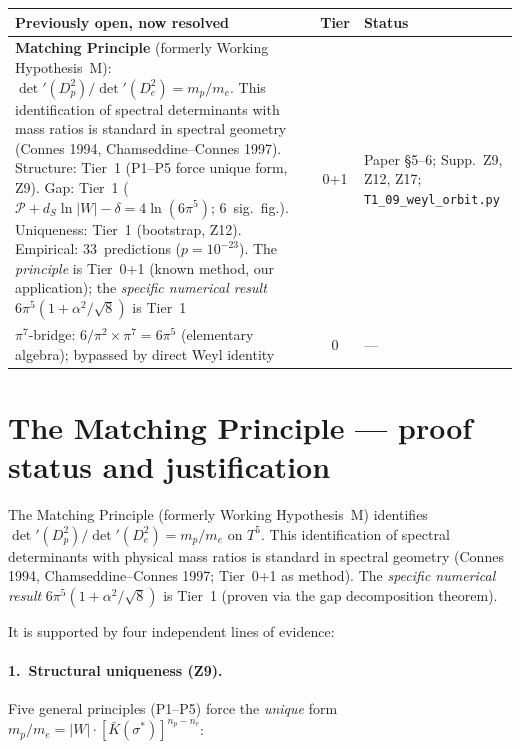 \documentclass[11pt,a4paper]{article}
\begin{document}
\bigskip
\begin{center}
\renewcommand{\arraystretch}{1.15}\small
\begin{tabular}{>{\raggedright}p{5.5cm}cp{5.5cm}}
\toprule
\textbf{Previously open, now resolved} & \textbf{Tier} & \textbf{Status}\\
\midrule
\rowcolor{tier01}
\textbf{Matching Principle} (formerly Working Hypothesis~M):
  $\det'(D_p^2)/\det'(D_e^2) = m_p/m_e$.
  This identification of spectral determinants with mass ratios
  is standard in spectral geometry (Connes 1994, Chamseddine--Connes 1997).
  Structure: Tier~1 (P1--P5 force unique form, Z9).
  Gap: Tier~1 ($\mathcal{P}+d_S\ln|W|-\delta = 4\ln(6\pi^5)$; 6~sig.\ fig.).
  Uniqueness: Tier~1 (bootstrap, Z12).
  Empirical: 33~predictions ($p=10^{-23}$).
  The \emph{principle} is Tier~0+1 (known method, our application);
  the \emph{specific numerical result} $6\pi^5(1+\alpha^2/\!\sqrt{8})$ is Tier~1
  & 0{+}1 & Paper \S 5--6; Supp.\ Z9, Z12, Z17;
  \texttt{T1\_09\_weyl\_orbit.py}\\
\rowcolor{tier0}
$\pi^7$-bridge: $6/\pi^2\times\pi^7=6\pi^5$ (elementary algebra);
  bypassed by direct Weyl identity
  & 0 & ---\\
\bottomrule
\end{tabular}
\end{center}

\section*{The Matching Principle --- proof status and justification}

The Matching Principle (formerly Working Hypothesis~M) identifies
$\det'(D_p^2)/\det'(D_e^2) = m_p/m_e$ on $T^5$.  This identification
of spectral determinants with physical mass ratios is standard in
spectral geometry (Connes 1994, Chamseddine--Connes 1997; Tier~0+1 as method).
The \emph{specific numerical result} $6\pi^5(1+\alpha^2/\!\sqrt{8})$
is Tier~1 (proven via the gap decomposition theorem).

It is supported by four independent lines of evidence:

\paragraph{1.\ Structural uniqueness (Z9).}
Five general principles (P1--P5) force the \emph{unique} form
$m_p/m_e = |W|\cdot[\bar K(\sigma^*)]^{n_p-n_e}$:
\end{document}
